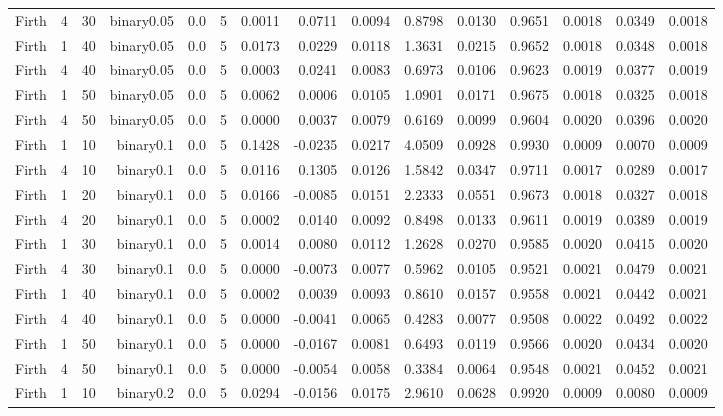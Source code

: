\begin{longtable}{rrrrrrrrrrrrrrr}
  Firth & 4 & 30 & binary0.05 & 0.0 & 5 & 0.0011 & 0.0711 & 0.0094 & 0.8798 & 0.0130 & 0.9651 & 0.0018 & 0.0349 & 0.0018 \\ 
  Firth & 1 & 40 & binary0.05 & 0.0 & 5 & 0.0173 & 0.0229 & 0.0118 & 1.3631 & 0.0215 & 0.9652 & 0.0018 & 0.0348 & 0.0018 \\ 
  Firth & 4 & 40 & binary0.05 & 0.0 & 5 & 0.0003 & 0.0241 & 0.0083 & 0.6973 & 0.0106 & 0.9623 & 0.0019 & 0.0377 & 0.0019 \\ 
  Firth & 1 & 50 & binary0.05 & 0.0 & 5 & 0.0062 & 0.0006 & 0.0105 & 1.0901 & 0.0171 & 0.9675 & 0.0018 & 0.0325 & 0.0018 \\ 
  Firth & 4 & 50 & binary0.05 & 0.0 & 5 & 0.0000 & 0.0037 & 0.0079 & 0.6169 & 0.0099 & 0.9604 & 0.0020 & 0.0396 & 0.0020 \\ 
  Firth & 1 & 10 & binary0.1 & 0.0 & 5 & 0.1428 & -0.0235 & 0.0217 & 4.0509 & 0.0928 & 0.9930 & 0.0009 & 0.0070 & 0.0009 \\ 
  Firth & 4 & 10 & binary0.1 & 0.0 & 5 & 0.0116 & 0.1305 & 0.0126 & 1.5842 & 0.0347 & 0.9711 & 0.0017 & 0.0289 & 0.0017 \\ 
  Firth & 1 & 20 & binary0.1 & 0.0 & 5 & 0.0166 & -0.0085 & 0.0151 & 2.2333 & 0.0551 & 0.9673 & 0.0018 & 0.0327 & 0.0018 \\ 
  Firth & 4 & 20 & binary0.1 & 0.0 & 5 & 0.0002 & 0.0140 & 0.0092 & 0.8498 & 0.0133 & 0.9611 & 0.0019 & 0.0389 & 0.0019 \\ 
  Firth & 1 & 30 & binary0.1 & 0.0 & 5 & 0.0014 & 0.0080 & 0.0112 & 1.2628 & 0.0270 & 0.9585 & 0.0020 & 0.0415 & 0.0020 \\ 
  Firth & 4 & 30 & binary0.1 & 0.0 & 5 & 0.0000 & -0.0073 & 0.0077 & 0.5962 & 0.0105 & 0.9521 & 0.0021 & 0.0479 & 0.0021 \\ 
  Firth & 1 & 40 & binary0.1 & 0.0 & 5 & 0.0002 & 0.0039 & 0.0093 & 0.8610 & 0.0157 & 0.9558 & 0.0021 & 0.0442 & 0.0021 \\ 
  Firth & 4 & 40 & binary0.1 & 0.0 & 5 & 0.0000 & -0.0041 & 0.0065 & 0.4283 & 0.0077 & 0.9508 & 0.0022 & 0.0492 & 0.0022 \\ 
  Firth & 1 & 50 & binary0.1 & 0.0 & 5 & 0.0000 & -0.0167 & 0.0081 & 0.6493 & 0.0119 & 0.9566 & 0.0020 & 0.0434 & 0.0020 \\ 
  Firth & 4 & 50 & binary0.1 & 0.0 & 5 & 0.0000 & -0.0054 & 0.0058 & 0.3384 & 0.0064 & 0.9548 & 0.0021 & 0.0452 & 0.0021 \\ 
  Firth & 1 & 10 & binary0.2 & 0.0 & 5 & 0.0294 & -0.0156 & 0.0175 & 2.9610 & 0.0628 & 0.9920 & 0.0009 & 0.0080 & 0.0009 \\ 

\end{longtable}
